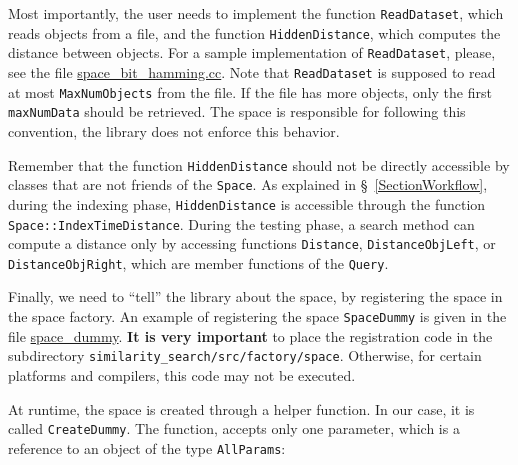 \documentclass[runningheads,a4paper]{llncs}
\newcommand{\ttt}[1]{\texttt{#1}}
\begin{document}
Most importantly, the user needs to implement the function \ttt{ReadDataset},
which reads objects from a file, and the function \ttt{HiddenDistance},
which computes the distance between objects.
For a sample implementation of \ttt{ReadDataset},
please, see the file
\href{https://github.com/searchivarius/NonMetricSpaceLib/blob/master/similarity_search/src/space/space_bit_hamming.cc}{space\_bit\_hamming.cc}.
Note that \ttt{ReadDataset} is supposed to read at most \ttt{MaxNumObjects}
from the file. If the file has more objects, only the first \ttt{maxNumData} should be retrieved.
The space is responsible for following this convention, the library does not enforce this behavior.

Remember that the function \ttt{HiddenDistance} should not be directly accessible 
by classes that are not friends of the \ttt{Space}.
As explained in \S~\ref{SectionWorkflow},
during the indexing phase, 
\ttt{HiddenDistance} is accessible through the function
\ttt{Space::IndexTimeDistance}.
During the testing phase, a search method can compute a distance
only by accessing functions \ttt{Distance}, \ttt{DistanceObjLeft}, or
\ttt{DistanceObjRight}, which are member functions of the \ttt{Query}.

Finally, we need to ``tell'' the library about the space,
by registering the space in the space factory.
An example of registering the space \ttt{SpaceDummy}
is given in the file \href{https://github.com/searchivarius/NonMetricSpaceLib/blob/master/similarity_search/src/factory/space/space_dummy.cc}{space\_dummy}.
\textbf{It is very important} to place the registration code in the subdirectory 
\ttt{similarity\_search/src/factory/space}. 
Otherwise, for certain platforms and compilers, this code may not be executed.
\newpage

At runtime, the space is created through a helper function.
In our case, it is called \ttt{CreateDummy}.
The function, accepts only one parameter,
which is a reference to an object of the type \ttt{AllParams}:
\end{document}
